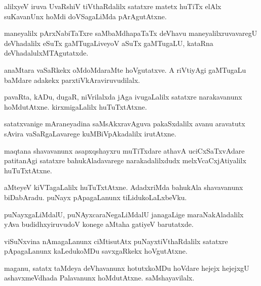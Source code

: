 \documentclass{article}
\begin{document}
\begin{mng}%
alilxyeV iruva UvaRshiV tiVthaRdalilx satatxre matetx huTiTx 
elAlx suKavanUnx hoMdi doVSagaLiMda pArAgutAtxne.
\end{mng}

\begin{mng}%
maneyalilx pArxNabiTaTxre saMbaMdhapaTaTx deVhavu maneyalilxruvavaregU
deVhadalilx eSuTx gaMTugaLiveyoV aSuTx gaMTugaLU, kataRna
deVhadalulxMTAgutatxde.
\end{mng}

\begin{mng}%
anaMtara vaSaRkekx oMdoMdaraMte hoVgutatxve. A riVtiyAgi
gaMTugaLu baMdare adakekx parxtiVkAraviruvudilalx.
\end{mng}

\begin{mng}%
pavaRta, kADu, dugaR, niVrilalxda jAga ivugaLalilx satatxre narakavanunx
hoMdutAtxne. kirxmigaLalilx huTuTxtAtxne.
\end{mng}

\begin{mng}%
satatxvanige mAraneyadina saMsAkxravAguva pakaSxdalilx avanu
aravatutx sAvira vaSaRgaLavarege kuMBiVpAkadalilx irutAtxne.
\end{mng}

\begin{mng}%
maqtana shavavanunx asapxqshayxru muTiTxdare athavA uciCxSaTxvAdare
patitanAgi satatxre bahukAladavarege narakadalilxdudx melxVcaCxjAtiyalilx
huTuTxtAtxne.
\end{mng}

\begin{mng}%
aMteyeV kiVTagaLalilx huTuTxtAtxne. AdadxriMda bahukAla shavavanunx
biDabAradu. puNayx pApagaLanunx tiLidukoLaLxbeVku.
\end{mng}

\begin{mng}%
puNayxgaLiMdalU, puNAyxcaraNegaLiMdalU janagaLige maraNakAladalilx
yAva budidhxyiruvudoV konege aMtaha gatiyeV barutatxde.
\end{mng}

\begin{mng}%
viSuNxvina nAmagaLanunx ciMtisutAtx puNayxtiVthaRdalilx satatxre
pApagaLanunx kaLedukoMDu savxgaRkekx hoVgutAtxne.
\end{mng}

\begin{mng}%
maganu, satatx taMdeya deVhavanunx hotutxkoMDu hoVdare hejejx hejejxgU ashavxmeVdhada Palavanunx hoMdutAtxne. saMshayavilalx.
\end{mng}
\end{document}
